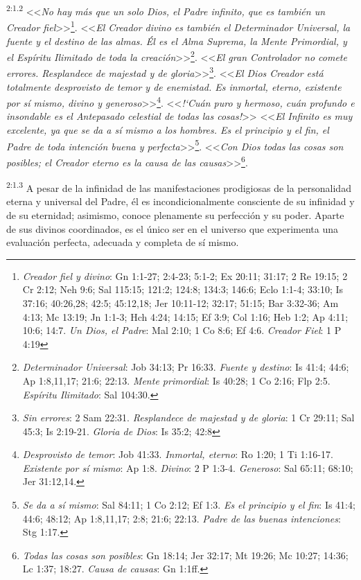 \par
\textsuperscript{2:1.2} <<\textit{No hay más que un solo Dios, el Padre infinito, que es también un Creador fiel}>>\footnote{\textit{Creador fiel y divino}: Gn 1:1-27; 2:4-23; 5:1-2; Ex 20:11; 31:17; 2 Re 19:15; 2 Cr 2:12; Neh 9:6; Sal 115:15; 121:2; 124:8; 134:3; 146:6; Eclo 1:1-4; 33:10; Is 37:16; 40:26,28; 42:5; 45:12,18; Jer 10:11-12; 32:17; 51:15; Bar 3:32-36; Am 4:13; Mc 13:19; Jn 1:1-3; Hch 4:24; 14:15; Ef 3:9; Col 1:16; Heb 1:2; Ap 4:11; 10:6; 14:7. \textit{Un Dios, el Padre}: Mal 2:10; 1 Co 8:6; Ef 4:6. \textit{Creador Fiel}: 1 P 4:19}. <<\textit{El Creador divino es también el Determinador Universal, la fuente y el destino de las almas. Él es el Alma Suprema, la Mente Primordial, y el Espíritu Ilimitado de toda la creación}>>\footnote{\textit{Determinador Universal}: Job 34:13; Pr 16:33. \textit{Fuente y destino}: Is 41:4; 44:6; Ap 1:8,11,17; 21:6; 22:13. \textit{Mente primordial}: Is 40:28; 1 Co 2:16; Flp 2:5. \textit{Espíritu Ilimitado}: Sal 104:30.}. <<\textit{El gran Controlador no comete errores. Resplandece de majestad y de gloria}>>\footnote{\textit{Sin errores}: 2 Sam 22:31. \textit{Resplandece de majestad y de gloria}: 1 Cr 29:11; Sal 45:3; Is 2:19-21. \textit{Gloria de Dios}: Is 35:2; 42:8}. <<\textit{El Dios Creador está totalmente desprovisto de temor y de enemistad. Es inmortal, eterno, existente por sí mismo, divino y generoso}>>\footnote{\textit{Desprovisto de temor}: Job 41:33. \textit{Inmortal, eterno}: Ro 1:20; 1 Ti 1:16-17. \textit{Existente por sí mismo}: Ap 1:8. \textit{Divino}: 2 P 1:3-4. \textit{Generoso}: Sal 65:11; 68:10; Jer 31:12,14.}. <<\textit{!`Cuán puro y hermoso, cuán profundo e insondable es el Antepasado celestial de todas las cosas!}>> <<\textit{El Infinito es muy excelente, ya que se da a sí mismo a los hombres. Es el principio y el fin, el Padre de toda intención buena y perfecta}>>\footnote{\textit{Se da a sí mismo}: Sal 84:11; 1 Co 2:12; Ef 1:3. \textit{Es el principio y el fin}: Is 41:4; 44:6; 48:12; Ap 1:8,11,17; 2:8; 21:6; 22:13. \textit{Padre de las buenas intenciones}: Stg 1:17.}. <<\textit{Con Dios todas las cosas son posibles; el Creador eterno es la causa de las causas}>>\footnote{\textit{Todas las cosas son posibles}: Gn 18:14; Jer 32:17; Mt 19:26; Mc 10:27; 14:36; Lc 1:37; 18:27. \textit{Causa de causas}: Gn 1:1ff.}.

\par
\textsuperscript{2:1.3} A pesar de la infinidad de las manifestaciones prodigiosas de la personalidad eterna y universal del Padre, él es incondicionalmente consciente de su infinidad y de su eternidad; asimismo, conoce plenamente su perfección y su poder. Aparte de sus divinos coordinados, es el único ser en el universo que experimenta una evaluación perfecta, adecuada y completa de sí mismo.

